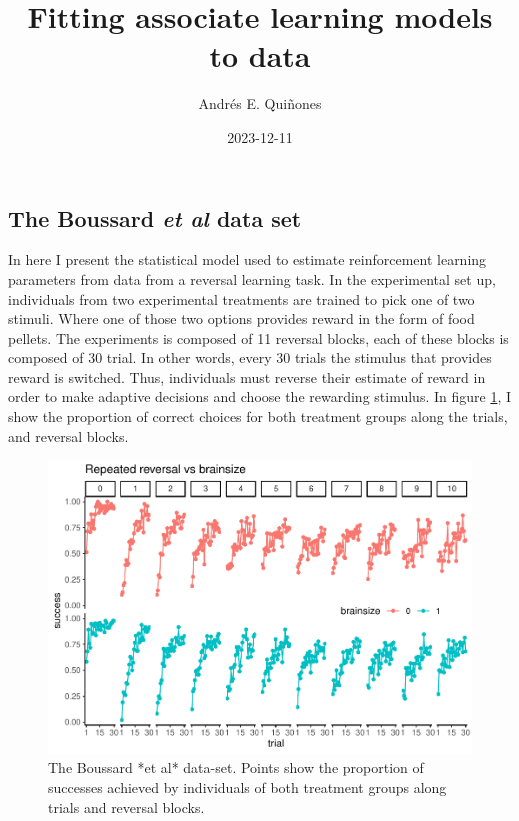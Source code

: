 \documentclass[
]{article}
\title{Fitting associate learning models to data}
\author{Andrés E. Quiñones}
\date{2023-12-11}
\begin{document}
\maketitle

\hypertarget{the-boussard-et-al-data-set}{%
\subsection{\texorpdfstring{The Boussard \emph{et al} data
set}{The Boussard et al data set}}\label{the-boussard-et-al-data-set}}

In here I present the statistical model used to estimate reinforcement
learning parameters from data from a reversal learning task. In the
experimental set up, individuals from two experimental treatments are
trained to pick one of two stimuli. Where one of those two options
provides reward in the form of food pellets. The experiments is composed
of 11 reversal blocks, each of these blocks is composed of 30 trial. In
other words, every 30 trials the stimulus that provides reward is
switched. Thus, individuals must reverse their estimate of reward in
order to make adaptive decisions and choose the rewarding stimulus. In
figure \ref{fig:plotBoussard}, I show the proportion of correct choices
for both treatment groups along the trials, and reversal blocks.

\begin{figure}

\includegraphics{report_files/figure-latex/plotBoussard-1} \hfill{}

\caption{The Boussard *et al* data-set. Points show the proportion of successes achieved by individuals of both treatment groups along trials and reversal blocks.}\label{fig:plotBoussard}
\end{figure}
\end{document}

